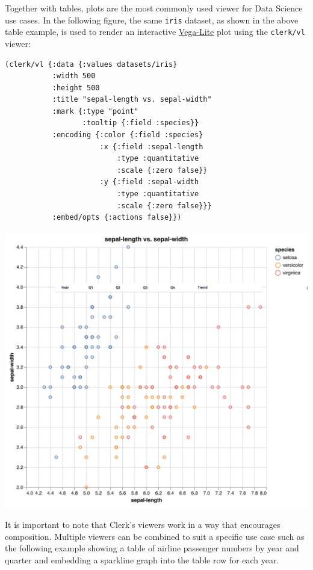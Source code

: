 \documentclass[sigconf,screen]{acmart}
\newcommand{\passthrough}[1]{#1}
\begin{document}
Together with tables, plots are the most commonly used viewer for Data Science use cases. In the following figure, the same \passthrough{\lstinline!iris!} dataset, as shown in the above table example, is used to render an interactive \href{https://vega.github.io/vega-lite/}{Vega-Lite} plot using the \passthrough{\lstinline!clerk/vl!} viewer:

\begin{lstlisting}
(clerk/vl {:data {:values datasets/iris}
           :width 500
           :height 500
           :title "sepal-length vs. sepal-width"
           :mark {:type "point"
                  :tooltip {:field :species}}
           :encoding {:color {:field :species}
                      :x {:field :sepal-length
                          :type :quantitative
                          :scale {:zero false}}
                      :y {:field :sepal-width
                          :type :quantitative
                          :scale {:zero false}}}
           :embed/opts {:actions false}})
\end{lstlisting}

\includegraphics{images/anon-expr-5dtjeGHWCqJb9X8RfQtspB6Cyeo8Yv-result.png}

It is important to note that Clerk's viewers work in a way that encourages composition. Multiple viewers can be combined to suit a specific use case such as the following example showing a table of airline passenger numbers by year and quarter and embedding a sparkline graph into the table row for each year.
\end{document}
